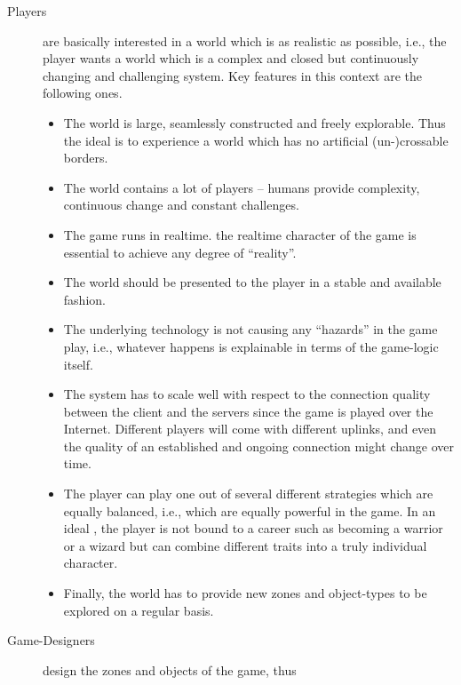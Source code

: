 \documentclass[a4paper, 10pt]{book}
\begin{document}
\begin{description}
    \item[Players] are basically interested in a world which is as
        realistic as possible, i.e., the player wants a world which is a
        complex and closed but continuously changing and challenging system.
        Key features in this context are the following ones.
        \begin{itemize}
            \item The world is large, seamlessly constructed and freely
                explorable. Thus the ideal is to experience a world which has no
                artificial (un-)crossable borders.
            \item The world contains a lot of players -- humans provide
                complexity, continuous change and constant challenges.
            \item The game runs in realtime. 
                the realtime character of the game is essential to achieve any
                degree of ``reality''. 
            \item The world should be presented to the player in a stable and
                available fashion. 
            \item The underlying technology is not causing any ``hazards'' in
                the game play, i.e., whatever happens is explainable in terms of
                the game-logic itself.
            \item The system has to scale well with respect to the connection
                quality between the client and the servers since the game is
                played over the Internet. Different players will come with
                different uplinks, and even the quality of an established and
                ongoing connection might change over time.
            \item The player can play one out of several different strategies
                which are equally balanced, i.e., which are equally powerful in
                the game. In an ideal \MMORG, the player is not bound to a career
                such as becoming a warrior or a wizard but can combine different
                traits into a truly individual character.
            \item Finally, the world has to provide new zones and object-types
                to be explored on a regular basis.
        \end{itemize}
    \item[Game-Designers] design the zones and objects of the game, thus

\end{description}
\end{document}
